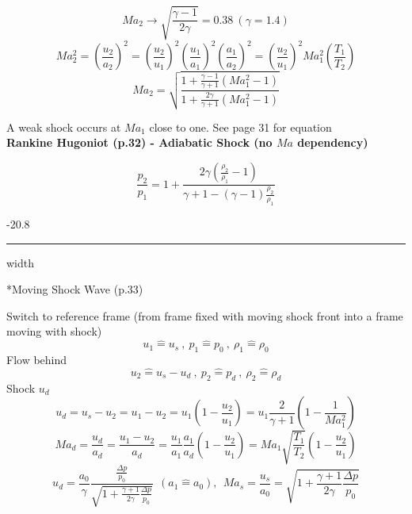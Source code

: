 \documentclass[8pt, landscape, fleqn]{scrartcl}
\makeatletter
\renewcommand{\subsubsection}{\@startsection{subsubsection}{1}{0mm}%
{-2\baselineskip}{0.8\baselineskip}%
{\hrule depth 0.2pt width\columnwidth\vspace*{1.2em}\normalsize\bfseries\rmfamily}}
\makeatother
\begin{document}
\begin{multicols*}{3}
\begin{equation}
    Ma_2 \rightarrow \sqrt{\frac{\gamma-1}{2\gamma}} = 0.38 ~ (\gamma = 1.4)
\end{equation}
\begin{equation*}
    Ma_2^2 = \left( \frac{u_2}{a_2}\right)^2 = \left( \frac{u_2}{u_1}\right)^2 \left( \frac{u_1}{a_1}\right)^2 \left( \frac{a_1}{a_2}\right)^2 = \left( \frac{u_2}{u_1}\right)^2 Ma_1^2 \left( \frac{T_1}{T_2}\right)
\end{equation*}
\begin{equation}
    Ma_2 = \sqrt{\frac{1 + \frac{\gamma -1}{\gamma + 1} \left( Ma_1^2 -1\right)}{1 + \frac{2\gamma}{\gamma + 1}\left( Ma_1^2 - 1\right)}}
\end{equation}

A weak shock occurs at $Ma_1$ close to one. See page 31 for equation \\

\textbf{Rankine Hugoniot (p.32) - Adiabatic Shock (no $Ma$ dependency)}

\begin{equation*}
    \frac{p_2}{p_1} = 1 + \frac{2 \gamma \left( \frac{\rho_2}{\rho_1}-1\right)}{\gamma + 1 - (\gamma -1)\frac{\rho_2}{\rho_1}}
\end{equation*} 

\subsubsection*{Moving Shock Wave (p.33)}

Switch to reference frame (from frame fixed with moving shock front into a frame moving with shock)
\begin{equation*}
    u_1 \widehat{=} u_s~,~ p_1 \widehat{=} p_0~,~ \rho_1 \widehat{=} \rho_0
\end{equation*}
Flow behind
\begin{equation*}
    u_2 \widehat{=} u_s-u_d~,~ p_2 \widehat{=} p_d~,~ \rho_2 \widehat{=} \rho_d
\end{equation*}
Shock $u_d$
\begin{equation*}
    u_d = u_s - u_2 = u_1 - u_2 = u_1 \left( 1 - \frac{u_2}{u_1}\right) = u_1 \frac{2}{\gamma+1}\left(1- \frac{1}{Ma_1^2}\right)
\end{equation*}
\begin{equation*}
    Ma_d = \frac{u_d}{a_d} = \frac{u_1-u_2}{a_d} = \frac{u_1}{a_1}\frac{a_1}{a_d}\left( 1- \frac{u_2}{u_1}\right) = Ma_1 \sqrt{\frac{T_1}{T_2}}\left(1-\frac{u_2}{u_1}\right)
\end{equation*}
\begin{equation*}
    u_d = \frac{a_0}{\gamma} \frac{\frac{\Delta p}{p_0}}{\sqrt{1 + \frac{\gamma+1}{2\gamma} \frac{\Delta p}{p_0}}}~~(a_1 \hat{=} a_0), ~~ Ma_s = \frac{u_s}{a_0} = \sqrt{1 + \frac{\gamma+1}{2\gamma}\frac{\Delta p}{p_0}}
\end{equation*}


\end{multicols*}
\end{document}
